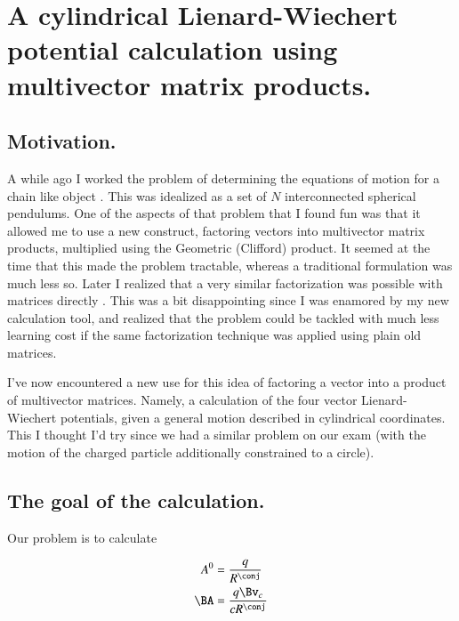 %
%

\chapter{A cylindrical Lienard-Wiechert potential calculation using multivector matrix products.}
\label{chap:matrixVectorPotentials}
{}
\date{April 30, 2011}

\beginArtWithToc

\section{Motivation.}

A while ago I worked the problem of determining the equations of motion for a chain like object .  This was idealized as a set of $N$ interconnected spherical pendulums.  One of the aspects of that problem that I found fun was that it allowed me to use a new construct, factoring vectors into multivector matrix products, multiplied using the Geometric (Clifford) product.  It seemed at the time that this made the problem tractable, whereas a traditional formulation was much less so.  Later I realized that a very similar factorization was possible with matrices directly \cite{multiPendulumSphericalMatrix}.  This was a bit disappointing since I was enamored by my new calculation tool, and realized that the problem could be tackled with much less learning cost if the same factorization technique was applied using plain old matrices.

I've now encountered a new use for this idea of factoring a vector into a product of multivector matrices.  Namely, a calculation of the four vector Lienard-Wiechert potentials, given a general motion described in cylindrical coordinates.  This I thought I'd try since we had a similar problem on our exam (with the motion of the charged particle additionally constrained to a circle).

\section{The goal of the calculation.}

Our problem is to calculate

\begin{align}\label{eqn:matrixVectorPotentials:10}
A^0 &= \frac{q}{R^\conj} \\
\BA &= \frac{q \Bv_c}{c R^\conj}
\end{align}

